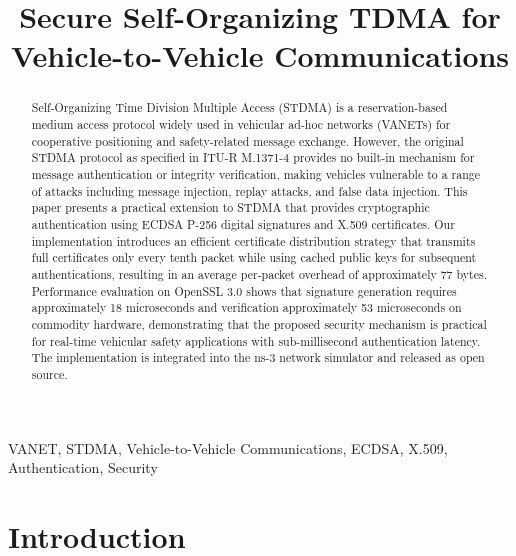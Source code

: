 \documentclass[conference]{IEEEtran}
\begin{document}
\title{Secure Self-Organizing TDMA for Vehicle-to-Vehicle Communications}

\author{
}

\maketitle

\begin{abstract}
Self-Organizing Time Division Multiple Access (STDMA) is a reservation-based medium access protocol widely used in vehicular ad-hoc networks (VANETs) for cooperative positioning and safety-related message exchange. However, the original STDMA protocol as specified in ITU-R M.1371-4 provides no built-in mechanism for message authentication or integrity verification, making vehicles vulnerable to a range of attacks including message injection, replay attacks, and false data injection. This paper presents a practical extension to STDMA that provides cryptographic authentication using ECDSA P-256 digital signatures and X.509 certificates. Our implementation introduces an efficient certificate distribution strategy that transmits full certificates only every tenth packet while using cached public keys for subsequent authentications, resulting in an average per-packet overhead of approximately 77 bytes. Performance evaluation on OpenSSL 3.0 shows that signature generation requires approximately 18 microseconds and verification approximately 53 microseconds on commodity hardware, demonstrating that the proposed security mechanism is practical for real-time vehicular safety applications with sub-millisecond authentication latency. The implementation is integrated into the ns-3 network simulator and released as open source.
\end{abstract}

\begin{IEEEkeywords}
VANET, STDMA, Vehicle-to-Vehicle Communications, ECDSA, X.509, Authentication, Security
\end{IEEEkeywords}

\section{Introduction}
\label{sec:introduction}
\end{document}
